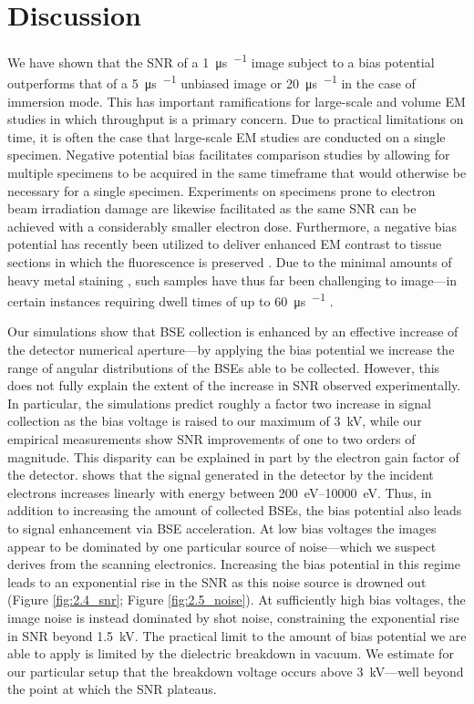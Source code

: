\section{Discussion}
\label{sec:2.3_discussion}

We have shown that the SNR of a \SI{1}{\micro\second\per\pixel} image subject to a bias potential outperforms that of a \SI{5}{\micro\second\per\pixel} unbiased image or \SI{20}{\micro\second\per\pixel} in the case of immersion mode. This has important ramifications for large-scale and volume EM studies in which throughput is a primary concern. Due to practical limitations on time, it is often the case that large-scale EM studies are conducted on a single specimen. Negative potential bias facilitates comparison studies by allowing for multiple specimens to be acquired in the same timeframe that would otherwise be necessary for a single specimen. Experiments on specimens prone to electron beam irradiation damage are likewise facilitated as the same SNR can be achieved with a considerably smaller electron dose. Furthermore, a negative bias potential has recently been utilized to deliver enhanced EM contrast to tissue sections in which the fluorescence is preserved \cite{vos2021retarding}. Due to the minimal amounts of heavy metal staining \cite{kukulski2011correlated}, such samples have thus far been challenging to image---in certain instances requiring dwell times of up to \SI{60}{\micro\second\per\pixel} \cite{peddie2014correlative}.

Our simulations show that BSE collection is enhanced by an effective increase of the detector numerical aperture---by applying the bias potential we increase the range of angular distributions of the BSEs able to be collected. However, this does not fully explain the extent of the increase in SNR observed experimentally. In particular, the simulations predict roughly a factor two increase in signal collection as the bias voltage is raised to our maximum of \SI{3}{\kilo\volt}, while our empirical measurements show SNR improvements of one to two orders of magnitude. This disparity can be explained in part by the electron gain factor of the detector. \textcite{vsakic2011boron} shows that the signal generated in the detector by the incident electrons increases linearly with energy between \SIrange{200}{10000}{\electronvolt}. Thus, in addition to increasing the amount of collected BSEs, the bias potential also leads to signal enhancement via BSE acceleration. At low bias voltages the images appear to be dominated by one particular source of noise---which we suspect derives from the scanning electronics. Increasing the bias potential in this regime leads to an exponential rise in the SNR as this noise source is drowned out (Figure \ref{fig:2.4_snr}; Figure \ref{fig:2.5_noise}). At sufficiently high bias voltages, the image noise is instead dominated by shot noise, constraining the exponential rise in SNR beyond \SI{1.5}{\kilo\volt}. The practical limit to the amount of bias potential we are able to apply is limited by the dielectric breakdown in vacuum. We estimate for our particular setup that the breakdown voltage occurs above \SI{3}{\kilo\volt}---well beyond the point at which the SNR plateaus.

